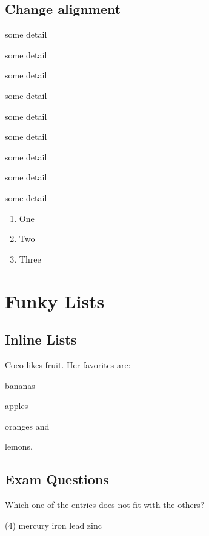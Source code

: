 \documentclass{article}
\begin{document}
\subsection{Change alignment}
\begin{description}[align=left]
	\item [A] some detail
	\item [B]some detail
	\item [C]some detail
\end{description}

\begin{description}[align=right]
	\item [A] some detail
	\item [B]some detail
	\item [C]some detail
\end{description}

\begin{description}[align=right,labelwidth=3cm]
	\item [A] some detail
	\item [B]some detail
	\item [C]some detail
\end{description}



\begin{enumerate}[label=(\alph*)]
	\item One
	\item Two
	\item Three
\end{enumerate}

\section{Funky Lists}
\subsection{Inline Lists}
Coco likes fruit. Her favorites are:
\begin{enumerate*}[label={\alph*)},font={\color{red!50!black}\bfseries}]
	\item bananas
	\item apples
	\item oranges and
	\item lemons.
\end{enumerate*}

\subsection{Exam Questions}
\begin{question}
	Which one of the entries does not fit with the others?
	\begin{tasks}(4)
		\task mercury
		\task iron
		\task lead
		\task zinc
	\end{tasks}
\end{question}
\end{document}
